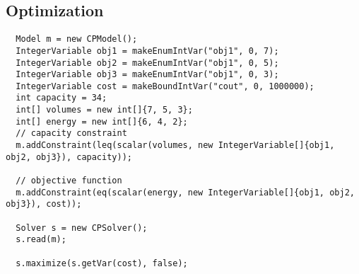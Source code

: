\subsection{Optimization}\label{solver:optimization}\hypertarget{solver:optimization}{}
\begin{lstlisting}
  Model m = new CPModel();
  IntegerVariable obj1 = makeEnumIntVar("obj1", 0, 7);
  IntegerVariable obj2 = makeEnumIntVar("obj1", 0, 5);
  IntegerVariable obj3 = makeEnumIntVar("obj1", 0, 3);
  IntegerVariable cost = makeBoundIntVar("cout", 0, 1000000);
  int capacity = 34;
  int[] volumes = new int[]{7, 5, 3};
  int[] energy = new int[]{6, 4, 2};
  // capacity constraint
  m.addConstraint(leq(scalar(volumes, new IntegerVariable[]{obj1, obj2, obj3}), capacity));
	
  // objective function
  m.addConstraint(eq(scalar(energy, new IntegerVariable[]{obj1, obj2, obj3}), cost));
  
  Solver s = new CPSolver();
  s.read(m);
  
  s.maximize(s.getVar(cost), false);
\end{lstlisting}
